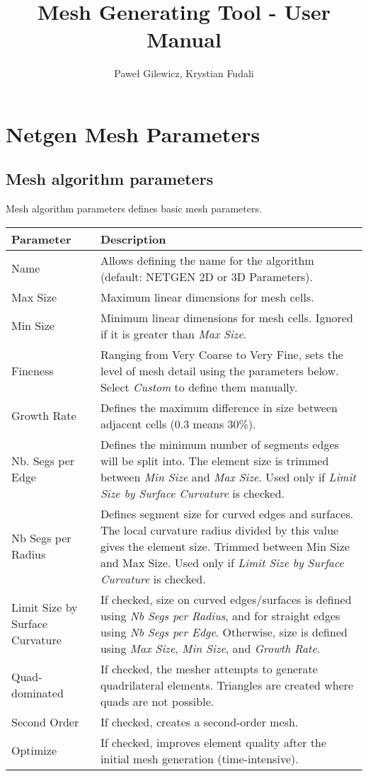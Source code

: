 \documentclass{article}
\title{Mesh Generating Tool - User Manual}
\author{Paweł Gilewicz, Krystian Fudali}
\begin{document}
\maketitle
\tableofcontents
\newpage

\section{Netgen Mesh Parameters} 
\subsection{Mesh algorithm parameters}
Mesh algorithm parameters defines basic mesh parameters.
\renewcommand{\arraystretch}{1.5} 
\setlength{\tabcolsep}{6pt} 

\begin{tabularx}{\textwidth}{|l|X|}
    \hline
    \textbf{Parameter} & \textbf{Description} \\
    \hline
    Name & Allows defining the name for the algorithm (default: NETGEN 2D or 3D Parameters). \\
    \hline
    Max Size & Maximum linear dimensions for mesh cells. \\
    \hline
    Min Size & Minimum linear dimensions for mesh cells. Ignored if it is greater than \textit{Max Size}. \\
    \hline
    Fineness & Ranging from Very Coarse to Very Fine, sets the level of mesh detail using the parameters below. Select \textit{Custom} to define them manually. \\
    \hline
    Growth Rate & Defines the maximum difference in size between adjacent cells (0.3 means 30\%). \\
    \hline
    Nb. Segs per Edge & Defines the minimum number of segments edges will be split into. The element size is trimmed between \textit{Min Size} and \textit{Max Size}. Used only if \textit{Limit Size by Surface Curvature} is checked. \\
    \hline 
    Nb Segs per Radius & Defines segment size for curved edges and surfaces. The local curvature radius divided by this value gives the element size. Trimmed between Min Size and Max Size. Used only if \textit{Limit Size by Surface Curvature} is checked. \\
    \hline
    Limit Size by Surface Curvature & If checked, size on curved edges/surfaces is defined using \textit{Nb Segs per Radius}, and for straight edges using \textit{Nb Segs per Edge}. Otherwise, size is defined using \textit{Max Size}, \textit{Min Size}, and \textit{Growth Rate}. \\
    \hline
    Quad-dominated & If checked, the mesher attempts to generate quadrilateral elements. Triangles are created where quads are not possible. \\
    \hline
    Second Order & If checked, creates a second-order mesh. \\
    \hline
    Optimize & If checked, improves element quality after the initial mesh generation (time-intensive). \\
    \hline
\end{tabularx}
\end{document}
